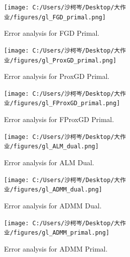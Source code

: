 \documentclass[10pt,a4paper]{article}
\begin{document}
 \begin{figure}[htbp]
 	\centering
 	\texttt{[image: C:/Users/沙柯岑/Desktop/大作业/figures/gl\_FGD\_primal.png]}
 	\caption{Error analysis for FGD Primal.}
 	\label{fig:error_analysis_fgd_primal}
 \end{figure}
 
 \begin{figure}[htbp]
 	\centering
 	\texttt{[image: C:/Users/沙柯岑/Desktop/大作业/figures/gl\_ProxGD\_primal.png]}
 	\caption{Error analysis for ProxGD Primal.}
 	\label{fig:error_analysis_proxgd_primal}
 \end{figure}
 
 \begin{figure}[htbp]
 	\centering
 	\texttt{[image: C:/Users/沙柯岑/Desktop/大作业/figures/gl\_FProxGD\_primal.png]}
 	\caption{Error analysis for FProxGD Primal.}
 	\label{fig:error_analysis_fproxgd_primal}
 \end{figure}
 
 \begin{figure}[htbp]
 	\centering
 	\texttt{[image: C:/Users/沙柯岑/Desktop/大作业/figures/gl\_ALM\_dual.png]}
 	\caption{Error analysis for ALM Dual.}
 	\label{fig:error_analysis_alm_dual}
 \end{figure}
 
 \begin{figure}[htbp]
 	\centering
 	\texttt{[image: C:/Users/沙柯岑/Desktop/大作业/figures/gl\_ADMM\_dual.png]}
 	\caption{Error analysis for ADMM Dual.}
 	\label{fig:error_analysis_admm_dual}
 \end{figure}
 
 \begin{figure}[htbp]
 	\centering
 	\texttt{[image: C:/Users/沙柯岑/Desktop/大作业/figures/gl\_ADMM\_primal.png]}
 	\caption{Error analysis for ADMM Primal.}
 	\label{fig:error_analysis_admm_primal}
 \end{figure}
\end{document}
